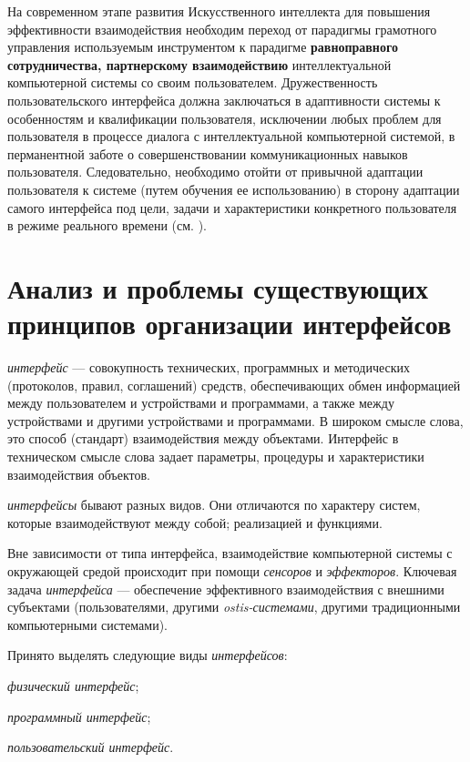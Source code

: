 На современном этапе развития Искусственного интеллекта для повышения эффективности взаимодействия необходим переход от парадигмы грамотного управления используемым инструментом к парадигме \textbf{равноправного сотрудничества, партнерскому взаимодействию} интеллектуальной компьютерной системы со своим пользователем. Дружественность пользовательского интерфейса должна заключаться в адаптивности системы к особенностям и квалификации пользователя, исключении любых проблем для пользователя в процессе диалога с интеллектуальной компьютерной системой, в перманентной заботе о совершенствовании коммуникационных навыков пользователя. Следовательно, необходимо отойти от привычной адаптации пользователя к системе (путем обучения ее использованию) в сторону адаптации самого интерфейса под цели, задачи и характеристики конкретного пользователя в режиме реального времени (см. ).

\section{Анализ и проблемы существующих принципов организации интерфейсов}
\label{sec_analysis}

\textit{интерфейс} --- совокупность технических, программных и методических (протоколов, правил, соглашений) средств, обеспечивающих обмен информацией между пользователем и устройствами и программами, а также между устройствами и другими устройствами и программами. В широком смысле слова, это способ (стандарт) взаимодействия между объектами. Интерфейс в техническом смысле слова задает параметры, процедуры и характеристики взаимодействия объектов.

\textit{интерфейсы} бывают разных видов. Они отличаются по характеру систем, которые взаимодействуют между собой; реализацией и функциями.

Вне зависимости от типа интерфейса, взаимодействие компьютерной системы с окружающей средой происходит при помощи \textit{сенсоров} и \textit{эффекторов}.
Ключевая задача \textit{интерфейса} --- обеспечение эффективного взаимодействия с внешними субъектами (пользователями, другими \textit{ostis-системами}, другими традиционными компьютерными системами).

Принято выделять следующие виды \textit{интерфейсов}:
\begin{textitemize}
	\item \textit{физический интерфейс};
	\item \textit{программный интерфейс};
	\item \textit{пользовательский интерфейс}.
\end{textitemize}

